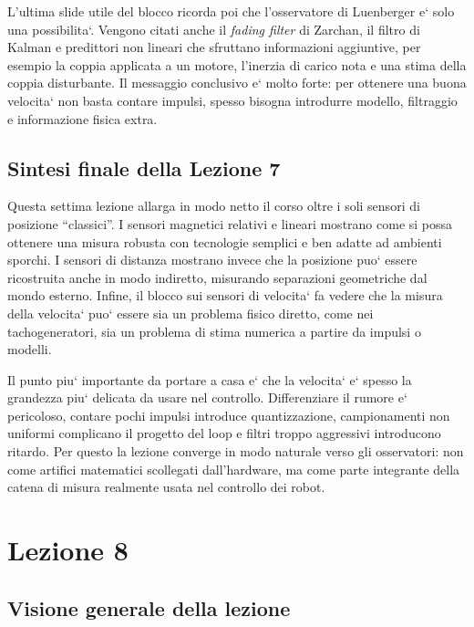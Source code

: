 \documentclass[11pt,a4paper]{article}
\begin{document}
L’ultima slide utile del blocco ricorda poi che l’osservatore di Luenberger e` solo una possibilita`. Vengono citati anche il \emph{fading filter} di Zarchan, il filtro di Kalman e predittori non lineari che sfruttano informazioni aggiuntive, per esempio la coppia applicata a un motore, l’inerzia di carico nota e una stima della coppia disturbante. Il messaggio conclusivo e` molto forte: per ottenere una buona velocita` non basta contare impulsi, spesso bisogna introdurre modello, filtraggio e informazione fisica extra.

\subsection*{Sintesi finale della Lezione 7}

Questa settima lezione allarga in modo netto il corso oltre i soli sensori di posizione ``classici''. I sensori magnetici relativi e lineari mostrano come si possa ottenere una misura robusta con tecnologie semplici e ben adatte ad ambienti sporchi. I sensori di distanza mostrano invece che la posizione puo` essere ricostruita anche in modo indiretto, misurando separazioni geometriche dal mondo esterno. Infine, il blocco sui sensori di velocita` fa vedere che la misura della velocita` puo` essere sia un problema fisico diretto, come nei tachogeneratori, sia un problema di stima numerica a partire da impulsi o modelli.

Il punto piu` importante da portare a casa e` che la velocita` e` spesso la grandezza piu` delicata da usare nel controllo. Differenziare il rumore e` pericoloso, contare pochi impulsi introduce quantizzazione, campionamenti non uniformi complicano il progetto del loop e filtri troppo aggressivi introducono ritardo. Per questo la lezione converge in modo naturale verso gli osservatori: non come artifici matematici scollegati dall’hardware, ma come parte integrante della catena di misura realmente usata nel controllo dei robot.


\clearpage
\section{Lezione 8}

\subsection{Visione generale della lezione}
\end{document}
